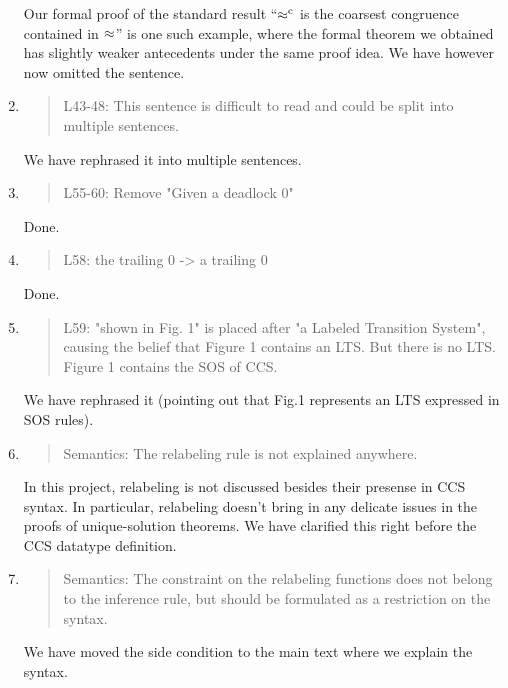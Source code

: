 \begin{enumerate}
  \Mark
  Our formal proof of the standard  result  ``$\mathrel{\approx^{\rm{c}}}$ is the
  coarsest congruence contained in $\approx$'' is one such example, where
  the formal theorem we obtained has slightly weaker antecedents under
  the same proof idea. We have however now omitted the sentence.

\item \begin{quote}
    L43-48: This sentence is difficult to read and could be split into multiple sentences.
  \end{quote}

  \Mark
  We have rephrased it into multiple sentences.
  
\item \begin{quote}
    L55-60: Remove "Given a deadlock 0"
  \end{quote}
  \Mark
  Done.
  
\item \begin{quote}
    L58: the trailing 0 -> a trailing 0
  \end{quote}
  \Mark
  Done.
  
\item \begin{quote}
    L59: "shown in Fig. 1" is placed after "a Labeled Transition
    System", causing the belief that Figure 1 contains an LTS. 
    But there is no LTS. Figure 1 contains the SOS of CCS.
  \end{quote}

  \Mark
  We have rephrased it (pointing out that Fig.1 represents an LTS expressed in SOS rules).

\item \begin{quote}
    Semantics: The relabeling rule is not explained anywhere.
  \end{quote}

  \Mark
  In this project, relabeling is not discussed besides their presense
  in CCS syntax. In particular, relabeling doesn't bring in any delicate issues
  in the proofs of unique-solution theorems.  We have clarified this
  right before the CCS datatype definition.

\item \begin{quote}
    Semantics: The constraint on the relabeling functions does not belong to the inference rule, but should be formulated as a restriction on the syntax.
  \end{quote}
  \Mark
  We have moved the side condition to the main text where we explain
  the syntax.
  

\end{enumerate}
